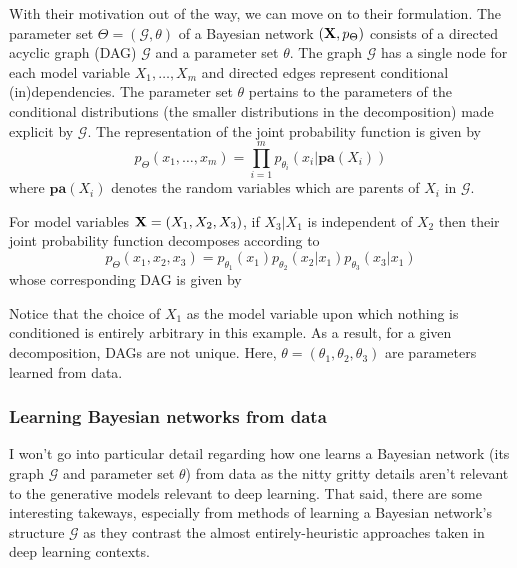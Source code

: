 \documentclass[11pt]{article}
\begin{document}
With their motivation out of the way, we can move on to their formulation. The parameter set $\Theta=(\mathcal{G},\theta)$ of a Bayesian network $(\mathbf{X},p_\Theta)$ consists of a directed acyclic graph (DAG) $\mathcal{G}$ and a parameter set $\theta$. The graph $\mathcal{G}$ has a single node for each model variable $X_1,\dots,X_m$ and directed edges represent conditional (in)dependencies. The parameter set $\theta$ pertains to the parameters of the conditional distributions (the smaller distributions in the decomposition) made explicit by $\mathcal{G}$. The representation of the joint probability function is given by
$$
p_{\Theta}(x_1,\dots,x_m)
=
\prod_{i=1}^m p_{\theta_i}(x_i|\textbf{pa}(X_i))
$$
where $\textbf{pa}(X_i)$ denotes the random variables which are parents of $X_i$ in $\mathcal{G}$.
\begin{example}
    For model variables $\mathbf{X}=(X_1,X_2,X_3)$, if $X_3|X_1$ is independent of $X_2$ then their joint probability function decomposes according to
    $$
    p_{\Theta}(x_1,x_2,x_3)
    =
    p_{\theta_1}(x_1)p_{\theta_2}(x_2|x_1)p_{\theta_3}(x_3|x_1)
    $$
    whose corresponding DAG is given by
    \begin{center}
    \end{center}
    Notice that the choice of $X_1$ as the model variable upon which nothing is conditioned is entirely arbitrary in this example. As a result, for a given decomposition, DAGs are not unique. Here, $\theta=(\theta_1,\theta_2,\theta_3)$ are parameters learned from data.
\end{example}

\subsubsection{Learning Bayesian networks from data}
I won't go into particular detail regarding how one learns a Bayesian network (its graph $\mathcal{G}$ and parameter set $\theta$) from data as the nitty gritty details aren't relevant to the generative models relevant to deep learning. That said, there are some interesting takeways, especially from methods of learning a Bayesian network's structure $\mathcal{G}$ as they contrast the almost entirely-heuristic approaches taken in deep learning contexts.
\end{document}
